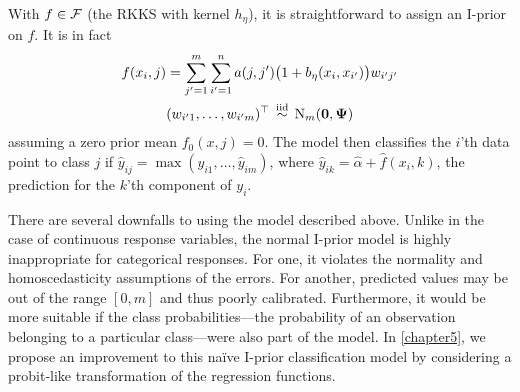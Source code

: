 With $f \in {\mathcal F}$ (the RKKS with kernel $h_\eta$), it is straightforward to assign an I-prior on $f$. 
It is in fact
\begin{align}\label{eq:naiveclassiprior}
  \begin{gathered}
    f(x_i,j) = \sum_{j'=1}^m\sum_{i'=1}^n a(j,j')\big(1 + b_\eta(x_i,x_{i'})\big) w_{i'j'} \\
    (w_{i'1},\dots,w_{i'm})^\top \,\overset{\text{iid}}{\sim}\, \operatorname{N}_m({\mathbf 0},{\bm\Psi})
  \end{gathered}
\end{align}
assuming a zero prior mean $f_0(x,j) = 0$.
The model then classifies the $i$'th data point to class $j$ if $\hat y_{ij} = \max(\hat y_{i1},\dots,\hat y_{im})$, where $\hat y_{ik} = \hat\alpha + \hat f(x_i,k)$, the prediction for the $k$'th component of $y_i$.

There are several downfalls to using the model described above.
Unlike in the case of continuous response variables, the normal I-prior model is highly inappropriate for categorical responses.
For one, it violates the normality and homoscedasticity assumptions of the errors.
For another, predicted values may be out of the range $[0,m]$ and thus poorly calibrated.
Furthermore, it would be more suitable if the class probabilities---the probability of an observation belonging to a particular class---were also part of the model.
In \cref{chapter5}, we propose an improvement to this naïve I-prior classification model by considering a probit-like transformation of the regression functions.

%  
%  
%  
%  



